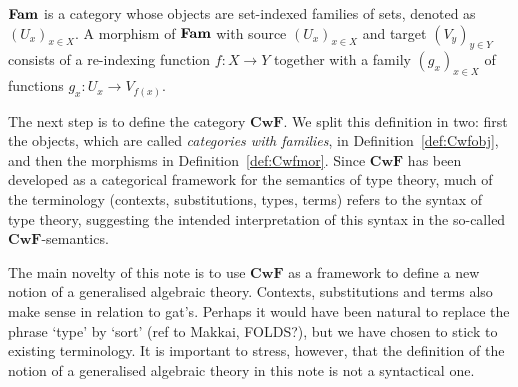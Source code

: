 \documentclass{lmcs}
\def\Cwf{\mathbf{CwF}}
\begin{document}
\begin{definition}\label{def:catFam}
$\textbf{Fam}$ is a category whose objects are
set-indexed families of sets, denoted as $(U_x)_{x\in X}$.
A morphism of $\textbf{Fam}$ with source $(U_x)_{x\in X}$ and target $(V_y)_{y\in Y}$
consists of a re-indexing function $f: X\to Y$ together with a family
$(g_x)_{x\in X}$ of functions $g_x : U_x \to V_{f(x)}$. %
\end{definition}

The next step is to define the category $\Cwf$. 
We split this definition in two: first the objects, 
which are called \emph{categories with families}, in Definition~\ref{def:Cwfobj},
and then the morphisms in Definition~\ref{def:Cwfmor}. 
Since $\Cwf$ has been developed as a categorical framework for the semantics of
type theory, much of the terminology (contexts, substitutions,
types, terms) refers to the syntax of type theory, 
suggesting the intended interpretation of this syntax in the 
so-called $\Cwf$-semantics.

The main novelty of this note is to use $\Cwf$ as a framework
to define a new notion of a generalised algebraic theory. 
Contexts, substitutions and terms also make
sense in relation to gat's. Perhaps it would have been natural
to replace the phrase `type' by `sort' (ref to Makkai, FOLDS?),
but we have chosen to stick to existing terminology.
It is important to stress, however, that the definition
of the notion of a generalised algebraic theory in this note
is not a syntactical one. 
\end{document}
